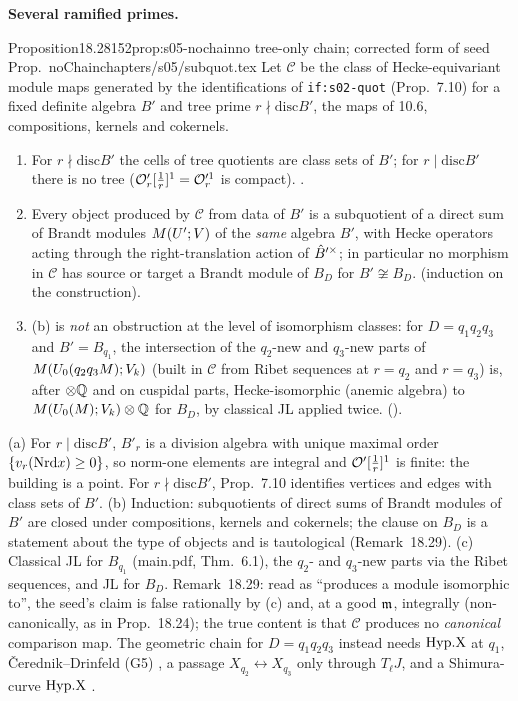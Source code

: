 \medskip\noindent\textbf{Several ramified primes.}\par
\begin{quoted}{Proposition}{18.28}{152}{prop:s05-nochain}{no tree-only chain; corrected form of seed Prop.~noChain}{chapters/s05/subquot.tex}\label{rpt:prop:s05-nochain}
Let $\mathcal C$ be the class of Hecke-equivariant module maps generated by the identifications of \texttt{if:s02-quot}
(Prop.~7.10) for a fixed definite algebra $B'$ and tree prime $r\nmid\mathrm{disc}B'$, the maps of 10.6,
compositions, kernels and cokernels.
\begin{enumerate}[label=(\alph*)]
\item For $r\nmid\mathrm{disc}B'$ the cells of tree quotients are class sets of $B'$; for $r\mid\mathrm{disc}B'$ there is no tree
  ($\mathcal{O}'_r[\frac1r]^1=\mathcal{O}'^1_r$ is compact). \stproved.
\item Every object produced by $\mathcal C$ from data of $B'$ is a subquotient of a direct sum of Brandt modules $M(U';V)$ of
  the \emph{same} algebra $B'$, with Hecke operators acting through the right-translation action of $\hat{B}'^\times$; in particular no
  morphism in $\mathcal C$ has source or target a Brandt module of $B_D$ for $B'\not\cong B_D$. \stproved{} (induction on the construction).
\item (b) is \emph{not} an obstruction at the level of isomorphism classes: for $D=q_1q_2q_3$ and $B'=B_{q_1}$, the intersection of the
  $q_2$-new and $q_3$-new parts of $M(U_0(q_2q_3M);V_k)$ (built in $\mathcal C$ from Ribet sequences at $r=q_2$ and $r=q_3$) is,
  after $\otimes\mathbb{Q}$ and on cuspidal parts, Hecke-isomorphic (anemic algebra) to $M(U_0(M);V_k)\otimes\mathbb{Q}$ for $B_D$, by classical JL
  applied twice. \stpmc{} ().
\end{enumerate}
\end{quoted}
\begin{outline}
(a) For $r\mid\mathrm{disc}B'$, $B'_r$ is a division algebra with unique maximal order $\{v_r(\mathrm{Nrd} x)\ge0\}$, so norm-one elements are
integral and $\mathcal{O}'[\frac1r]^1$ is finite: the building is a point. For $r\nmid\mathrm{disc}B'$, Prop.~7.10 identifies vertices and edges with
class sets of $B'$. (b) Induction: subquotients of direct sums of Brandt modules of $B'$ are closed under compositions, kernels and
cokernels; the clause on $B_D$ is a statement about the type of objects and is tautological (Remark~18.29). (c) Classical JL for
$B_{q_1}$ (main.pdf, Thm.~6.1), the $q_2$- and $q_3$-new parts via the Ribet sequences, and JL for $B_D$. Remark~18.29: read as
``produces a module isomorphic to'', the seed's claim is false rationally by (c) and, at a good $\mathfrak{m}$, integrally (non-canonically, as in
Prop.~18.24); the true content is that $\mathcal C$ produces no \emph{canonical} comparison map. The geometric chain for $D=q_1q_2q_3$
instead needs $\mathrm{Hyp.X}$ at $q_1$, Čerednik--Drinfeld (G5) \cite[Thm.~(5.2), pp.~140--141]{BC}, a passage $X_{q_2}\leftrightarrow X_{q_3}$ only
through $T_\ell J$, and a Shimura-curve $\mathrm{Hyp.X}$ \cite[Thm.~4.3, p.~11]{Koh01}.
\end{outline}

